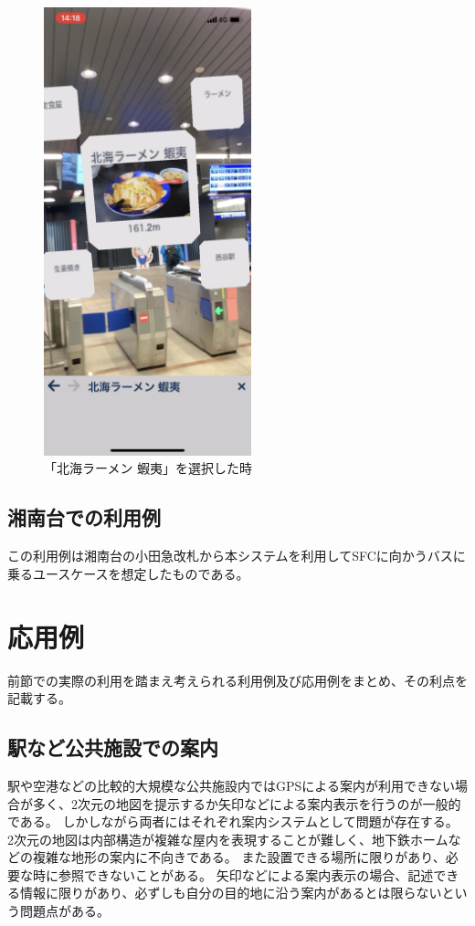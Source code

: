 \begin{figure}[h]
  \centering
  \includegraphics[width=60mm]{images/nishiya_ezo_ar.png}
  \caption{「北海ラーメン 蝦夷」を選択した時} \label{fig:nishiya_ezo_ar}
\end{figure}


\subsection{湘南台での利用例}
この利用例は湘南台の小田急改札から本システムを利用してSFCに向かうバスに乗るユースケースを想定したものである。

\section{応用例}
前節での実際の利用を踏まえ考えられる利用例及び応用例をまとめ、その利点を記載する。

\subsection{駅など公共施設での案内}
駅や空港などの比較的大規模な公共施設内ではGPSによる案内が利用できない場合が多く、2次元の地図を提示するか矢印などによる案内表示を行うのが一般的である。
しかしながら両者にはそれぞれ案内システムとして問題が存在する。
2次元の地図は内部構造が複雑な屋内を表現することが難しく、地下鉄ホームなどの複雑な地形の案内に不向きである。
また設置できる場所に限りがあり、必要な時に参照できないことがある。
矢印などによる案内表示の場合、記述できる情報に限りがあり、必ずしも自分の目的地に沿う案内があるとは限らないという問題点がある。

